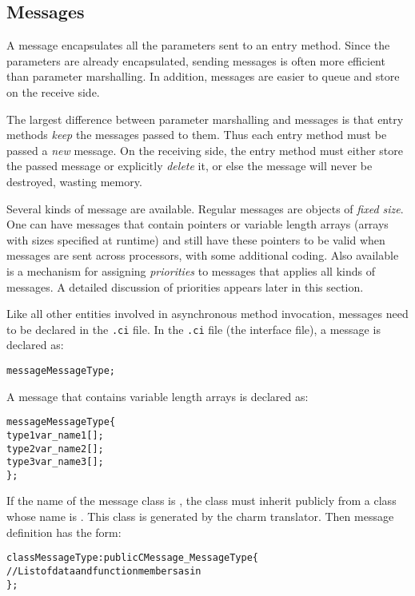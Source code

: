 \subsection{Messages}

\label{messages}
A message encapsulates all the parameters sent to an
entry method.  Since the parameters are already encapsulated,
sending messages is often more efficient than parameter marshalling.
In addition, messages are easier to queue and store on the
receive side.

The largest difference between parameter marshalling and messages
is that entry methods {\em keep} the messages passed to them.
Thus each entry method must be passed a {\em new} message.
On the receiving side, the entry method must either store the
passed message or explicitly {\em delete} it, or else the message
will never be destroyed, wasting memory.

Several kinds of message are available.
Regular \charmpp{} messages are objects of
\textit{fixed size}. One can have messages that contain pointers or variable
length arrays (arrays with sizes specified at runtime) and still have these
pointers to be valid when messages are sent across processors, with some
additional coding.  Also available is a mechanism for assigning
\textit{priorities} to messages that applies all kinds of messages.
A detailed discussion of priorities appears later in this section.

Like all other entities involved in asynchronous method invocation, messages
need to be declared in the {\tt .ci} file. In the {\tt .ci} file (the
interface file), a message is declared as: 

\begin{alltt}
 message MessageType;
\end{alltt}

A message that contains variable length arrays is declared as:

\begin{alltt}
 message MessageType \{
   type1 var_name1[];
   type2 var_name2[];
   type3 var_name3[];
\};
\end{alltt}

If the name of the message class is , the class must inherit 
publicly from a class whose name is . This class
is generated by the charm translator. Then message definition has the form:

\begin{alltt}
 class MessageType : public CMessage_MessageType \{
    // List of data and function members as in \CC
 \};
\end{alltt}


